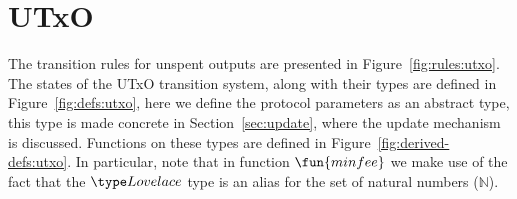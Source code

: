\newcommand{\PPMMap}{\ensuremath{\type{Ppms}}}
\newcommand{\Lmax}{\ensuremath{\mathbb{L}_{\var{max}}}}
\section{UTxO}
\label{sec:state-trans-utxo-1}

The transition rules for unspent outputs are presented in
Figure~\ref{fig:rules:utxo}. The states of the UTxO transition system, along
with their types are defined in Figure~\ref{fig:defs:utxo}, here we define the
protocol parameters as an abstract type, this type is made concrete in
Section~\ref{sec:update}, where the update mechanism is discussed. Functions on
these types are defined in Figure~\ref{fig:derived-defs:utxo}. In particular,
note that in function $\fun{minfee}$ we make use of the fact that the
$\Lovelace$ type is an alias for the set of natural numbers ($\mathbb{N}$).

